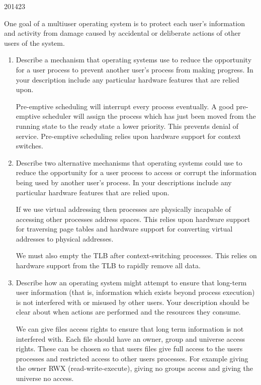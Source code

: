 \documentclass[10pt,\jkfside,a4paper]{article}
\begin{document}
\begin{examquestion}{2014}{2}{3}

One goal of a multiuser operating system is to protect each user’s information and
activity from damage caused by accidental or deliberate actions of other users of the
system.

\begin{enumerate}

\item \label{prempt} Describe a mechanism that operating systems use to reduce the opportunity for
a user process to prevent another user’s process from making progress. In your
description include any particular hardware features that are relied upon.

Pre-emptive scheduling will interrupt every process eventually. A good pre-emptive scheduler 
will assign the process which has just been moved from the running state to the ready 
state a lower priority. This prevents denial of service. Pre-emptive scheduling relies 
upon hardware support for context switches.

\item \label{alternatives} Describe two alternative mechanisms that operating systems could use to reduce
the opportunity for a user process to access or corrupt the information being used
by another user’s process. In your descriptions include any particular hardware
features that are relied upon.

If we use virtual addressing then processes are physically incapable of accessing 
other processes address spaces. This relies upon hardware support for traversing 
page tables and hardware support for converting virtual addresses to physical addresses.

We must also empty the TLB after context-switching processes. This 
relies on hardware support from the TLB to rapidly remove all data.

\item \label{longterm} Describe how an operating system might attempt to ensure that long-term user
information (that is, information which exists beyond process execution) is not
interfered with or misused by other users. Your description should be clear
about when actions are performed and the resources they consume.

We can give files access rights to ensure that long term information is not 
interfered with. Each file should have an owner, group and universe access rights. 
These can be chosen so that users files give full access to the users processes and 
restricted access to other users processes. For example giving the owner RWX (read-write-execute), 
giving no groups access and giving the universe no access.


\end{enumerate}
\end{examquestion}
\end{document}
